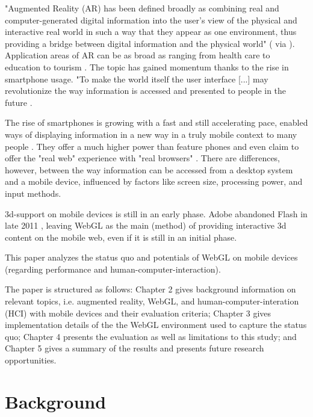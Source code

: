 \documentclass[12pt,journal,compsoc]{IEEEtran}
\begin{document}
"Augmented Reality (AR) has been defined broadly as combining real and computer-generated digital information into the user’s view of the physical and interactive real world in such a way that they appear as one environment, thus providing a bridge between digital information and the physical world" (\cite{Hoellerer2004,Klopfer2007,Vallino1998,Wellner1993} via \cite{Olsson2011b}). Application areas of AR can be as broad as ranging from health care \cite{Lui2011} to education \cite{Mannuss2011} to tourism \cite{Mulloni2011}. The topic has gained momentum thanks to the rise in smartphone usage. "To make the world itself the user interface [...] may revolutionize the way information is accessed and presented to people in the future \cite{Hoellerer2004,Wellner1993}.


The rise of smartphones is growing with a fast and still accelerating pace, enabled ways of displaying information in a new way in a truly mobile context to many people \cite{Gartner2010,Nielsen2011}. They offer a much higher power than feature phones and even claim to offer the "real web" experience with "real browsers" \cite{informationweek2007}. There are differences, however, between the way information can be accessed from a desktop system and a mobile device, influenced by factors like screen size, processing power, and input methods.

3d-support on mobile devices is still in an early phase. Adobe abandoned Flash in late 2011 \cite{Flash2011}, leaving WebGL as the main (method) of providing interactive 3d content on the mobile web, even if it is still in an initial phase.

This paper analyzes the status quo and potentials of WebGL on mobile devices (regarding performance and human-computer-interaction).

The paper is structured as follows: Chapter 2 gives background information on relevant topics, i.e. augmented reality, WebGL, and human-computer-interation (HCI) with mobile devices and their evaluation criteria; Chapter 3 gives implementation details of the the WebGL environment used to capture the status quo; Chapter 4 presents the evaluation as well as limitations to this study; and Chapter 5 gives a summary of the results and presents future research opportunities.

\section{Background}
\end{document}
